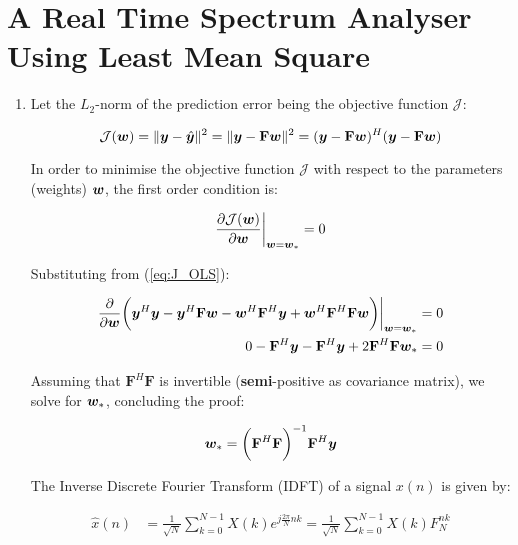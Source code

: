 \section{A Real Time Spectrum Analyser Using Least Mean Square}

\begin{enumerate}[label=\alph*), leftmargin=*]

\item
%

Let the $L_{2}$-norm of the prediction error being the objective function $\mathcal{J}$:

\begin{equation}
    \mathcal{J}({\bm{w}}) = \| {\bm{y}} - \hat{{\bm{y}}} \|^{2} = \| {\bm{y}} - \mathbf{F} {\bm{w}} \|^{2} = ({\bm{y}} - \mathbf{F} {\bm{w}})^{H} ({\bm{y}} - \mathbf{F} {\bm{w}})
\label{eq:J_OLS}
\end{equation}

In order to minimise the objective function $\mathcal{J}$ with respect to the parameters (weights) ${\bm{w}}$, the first order condition is:

\begin{equation}
    \frac{\partial \mathcal{J}({\bm{w}})}{\partial {\bm{w}}} \bigg\vert_{{\bm{w}}={\bm{w}}_{*}}  = 0
\end{equation}

Substituting from (\ref{eq:J_OLS}):

\begin{align}
    \frac{\partial}{\partial {\bm{w}}} \bigg( {\bm{y}}^{H} {\bm{y}} - {\bm{y}}^{H} \mathbf{F} {\bm{w}} - {\bm{w}}^{H} \mathbf{F}^{H} {\bm{y}} + {\bm{w}}^{H} \mathbf{F}^{H} \mathbf{F} {\bm{w}} \bigg) \bigg\vert_{{\bm{w}}={\bm{w}}_{*}}  &= 0 \\
    0 - \mathbf{F}^{H} {\bm{y}} - \mathbf{F}^{H} {\bm{y}} + 2 \mathbf{F}^{H} \mathbf{F} {\bm{w}}_{*} &= 0
\end{align}

Assuming that $\mathbf{F}^{H} \mathbf{F}$ is invertible (\textbf{semi}-positive as covariance matrix), we solve for ${\bm{w}}_{*}$, concluding the proof:

\begin{equation}
    {\bm{w}}_{*} = \bigg( \mathbf{F}^{H} \mathbf{F} \bigg)^{-1} \mathbf{F}^{H} {\bm{y}}
\label{proof:OLS}
\end{equation}

The Inverse Discrete Fourier Transform (IDFT) of a signal $x(n)$ is given by:

\begin{align}
    \hat{x}(n)  &= \frac{1}{\sqrt{N}} \sum_{k=0}^{N-1} X(k) e^{j \frac{2\pi}{N} n k}
                 = \frac{1}{\sqrt{N}} \sum_{k=0}^{N-1} X(k) F_{N}^{nk}
\end{align}


\end{enumerate}
